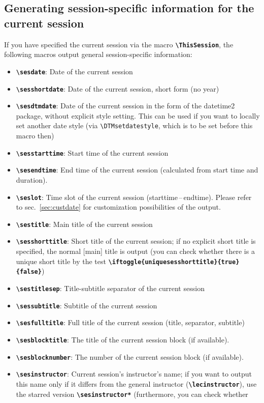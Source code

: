 \documentclass[english]{article}
\newcommand*\jmacro[1]{\textbf{\texttt{#1}}}
\newcommand*\jcsmacro[1]{\jmacro{\textbackslash{#1}}}
\newcommand*\jfmacro[1]{\texttt{#1}}
\newcommand*\jfcsmacro[1]{\jfmacro{\textbackslash{#1}}}
\newcommand*\jparam[1]{\angus #1\angud}
\begin{document}
\subsection{Generating session-specific information for the current session}

If you have specified the current session via the macro \jcsmacro{ThisSession},
the following macros output general session-specific information:
\begin{itemize}
\item \jcsmacro{sesdate}: Date of the current session
\item \jcsmacro{sesshortdate}: Date of the current session,
short form (no year)
\item \jcsmacro{sesdtmdate}: Date of the current session in the form of the
       \textsf{datetime2} package, without explicit style setting.
       This can be used if you want to locally set another
       date style (via \jfcsmacro{DTMsetdatestyle}, which is to be set before this macro then)
\item \jcsmacro{sesstarttime}: Start time of the current session
\item \jcsmacro{sesendtime}: End time of the current session (calculated from start time and duration).
\item \jcsmacro{seslot}: Time slot of the current session (starttime\,--\,endtime). Please refer to
sec.~\ref{sec:custdate} for customization possibilities of the output.
\item \jcsmacro{sestitle}: Main title of the current session
\item \jcsmacro{sesshorttitle}: Short title of the current session; if
no explicit short title is specified, the normal [main] title is output
(you can check whether there is a unique short title by the test
\jcsmacro{iftoggle\{uniquesesshorttitle\}\{\jparam{true}\}\{\jparam{false}\}})
\item \jcsmacro{sestitlesep}: Title-subtitle separator of
the current session
\item \jcsmacro{sessubtitle}: Subtitle of the current session
\item \jcsmacro{sesfulltitle}: Full title of the current
session (title, separator, subtitle)
\item \jcsmacro{sesblocktitle}: The title of the current session block (if available).
\item \jcsmacro{sesblocknumber}: The number of the current session block (if available).
\item \jcsmacro{sesinstructor}: Current session's instructor's name; if you want to output this name only if it differs from the general instructor (\jcsmacro{lecinstructor}), use the starred version \jcsmacro{sesinstructor*} (furthermore, you can check whether

\end{itemize}
\end{document}

